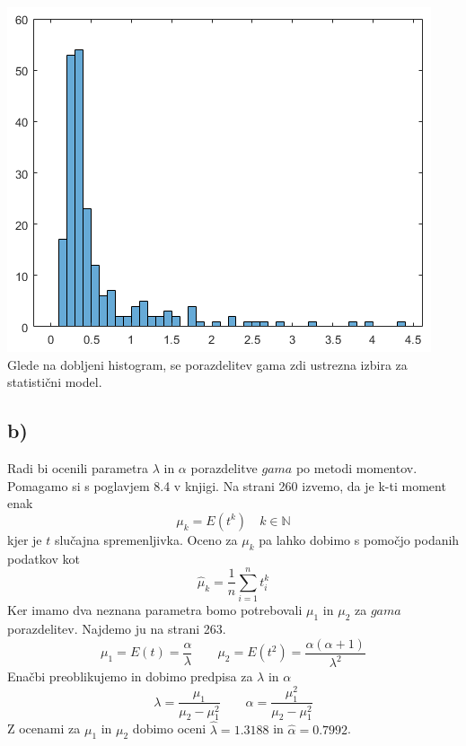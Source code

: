\documentclass[A4paper, 11pt]{article}
\begin{document}
\includegraphics[scale=0.8]{Kiti_1}
\\
Glede na dobljeni histogram, se porazdelitev gama zdi ustrezna izbira za statistični model.

\subsection*{b)}
Radi bi ocenili parametra $\lambda$ in $\alpha$  porazdelitve $gama$ po metodi momentov. Pomagamo si s poglavjem 8.4 v knjigi. Na strani 260 izvemo, da je k-ti moment enak
\[ \mu_k = E(t^k) \quad k \in \mathbb{N} \]
kjer je $t$ slučajna spremenljivka. Oceno za $\mu_k$ pa lahko dobimo s pomočjo podanih podatkov kot
\[ \hat{\mu}_k = \frac{1}{n} \sum_{i=1}^{n} t_i^k \]
Ker imamo dva neznana parametra bomo potrebovali $\mu_1$ in $\mu_2$ za $gama$ porazdelitev. Najdemo ju na strani 263.
\[ \mu_1 = E(t) = \frac{\alpha}{\lambda} \qquad \mu_2 = E(t^2) = \frac{\alpha (\alpha + 1)}{\lambda^2} \]
Enačbi preoblikujemo in dobimo predpisa za $\lambda$ in $\alpha$
\[ \lambda = \frac{\mu_1}{\mu_2 - \mu_1^2} \qquad \alpha = \frac{\mu_1^2}{\mu_2 - \mu_1^2} \]
Z ocenami za $\mu_1$ in $\mu_2$ dobimo oceni $\hat{\lambda} = 1.3188$ in $\hat{\alpha} = 0.7992$. 
\end{document}
